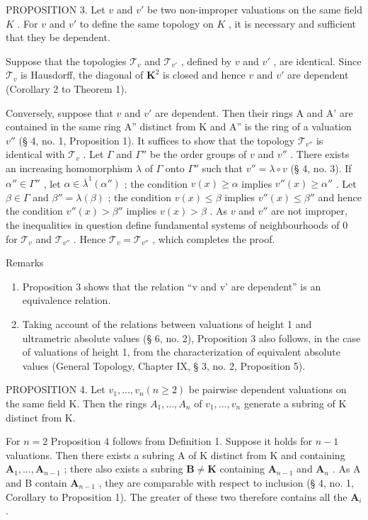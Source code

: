 PROPOSITION 3. Let \(v\) and \(v'\) be two non-improper valuations on the same field \(K\) . For \(v\) and \(v'\) to define the same topology on \(K\) , it is necessary and sufficient that they be dependent.

Suppose that the topologies \(\mathcal{T}_v\) and \(\mathcal{T}_{v'}\) , defined by \(v\) and \(v'\) , are identical. Since \(\mathcal{T}_v\) is Hausdorff, the diagonal of \(\mathbf{K}^2\) is closed and hence \(v\) and \(v'\) are dependent (Corollary 2 to Theorem 1).

Conversely, suppose that \(v\) and \(v'\) are dependent. Then their rings A and A' are contained in the same ring A'' distinct from K and A'' is the ring of a valuation \(v''\) (§ 4, no. 1, Proposition 1). It suffices to show that the topology \(\mathcal{T}_{v''}\) is identical with \(\mathcal{T}_v\) . Let \(\Gamma\) and \(\Gamma''\) be the order groups of \(v\) and \(v''\) . There exists an increasing homomorphism \(\lambda\) of \(\Gamma\) onto \(\Gamma''\) such that \(v'' = \lambda \circ v\) (§ 4, no. 3). If \(\alpha'' \in \Gamma''\) , let \(\alpha \in \overline{\lambda}^{1}(\alpha'')\) ; the condition \(v(x) \geqslant \alpha\) implies \(v''(x) \geqslant \alpha''\) . Let \(\beta \in \Gamma\) and \(\beta'' = \lambda(\beta)\) ; the condition \(v(x) \leqslant \beta\) implies \(v''(x) \leqslant \beta''\) and hence the condition \(v''(x) > \beta''\) implies \(v(x) > \beta\) . As \(v\) and \(v''\) are not improper, the inequalities in question define fundamental systems of neighbourhoods of 0 for \(\mathcal{T}_v\) and \(\mathcal{T}_{v''}\) . Hence \(\mathcal{T}_v = \mathcal{T}_{v''}\) , which completes the proof.

Remarks

\begin{enumerate}
\def\labelenumi{(\arabic{enumi})}
\item
  Proposition 3 shows that the relation ``v and v' are dependent'' is an equivalence relation.
\item
  Taking account of the relations between valuations of height 1 and ultrametric absolute values (§ 6, no. 2), Proposition 3 also follows, in the case of valuations of height 1, from the characterization of equivalent absolute values (General Topology, Chapter IX, § 3, no. 2, Proposition 5).
\end{enumerate}

PROPOSITION 4. Let \(v_{1}, \ldots, v_{n} (n \geqslant 2)\) be pairwise dependent valuations on the same field K. Then the rings \(A_{1}, \ldots, A_{n}\) of \(v_{1}, \ldots, v_{n}\) generate a subring of K distinct from K.

For \(n = 2\) Proposition 4 follows from Definition 1. Suppose it holds for \(n - 1\) valuations. Then there exists a subring A of K distinct from K and containing \(\mathbf{A}_1, \ldots, \mathbf{A}_{n-1}\) ; there also exists a subring \(\mathbf{B} \neq \mathbf{K}\) containing \(\mathbf{A}_{n-1}\) and \(\mathbf{A}_n\) . As A and B contain \(\mathbf{A}_{n-1}\) , they are comparable with respect to inclusion (§ 4, no. 1, Corollary to Proposition 1). The greater of these two therefore contains all the \(\mathbf{A}_i\) .

